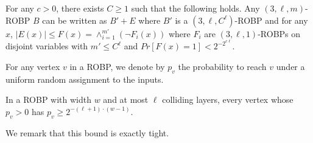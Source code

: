 \begin{lemma}\label{lem:structcolliding}
For any $c > 0$, there exists  $C \geq 1$ such that the following holds. Any $(3,\ell,m)$-ROBP $B$ can be written as $B' + E$ where $B'$ is a $(3,\ell,C^\ell)$-ROBP and for any $x$, $|E(x)| \leq F(x) = \wedge_{i=1}^{m'} (\neg F_i(x))$ where $F_i$ are $(3,\ell,1)$-ROBPs on disjoint variables with $m' \leq C^\ell$ and $Pr[F(x) = 1] < 2^{-2^{c\ell}}$. 
\end{lemma}

For any vertex $v$ in a ROBP, we denote by $p_v$ the probability to reach $v$ under a uniform random assignment to the inputs.

\begin{claim}\label{claim:pv-large}
In a ROBP with width $w$ and at most $\ell$ colliding layers, every vertex whose $p_v>0$ has $p_v \ge 2^{-(\ell+1)\cdot(w-1)}$.
\end{claim}
We remark that this bound is exactly tight.
